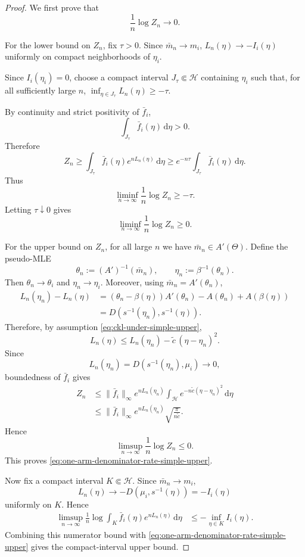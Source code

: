 \documentclass[10pt]{article}
\newcommand{\dd}{\mathrm{d}}
\theoremstyle{plain}
\begin{document}
\begin{proof}
We first prove that
\begin{equation}
\label{eq:one-arm-denominator-rate-simple-upper}
    \frac1n\log Z_n\to0.
\end{equation}

For the lower bound on \(Z_n\), fix \(\tau>0\).  Since $\bar m_n\to m_i$, $L_n(\eta)\to -I_i(\eta)$ uniformly on compact neighborhoods of \(\eta_i\).  

Since \(I_i(\eta_i)=0\), choose a compact interval \(J_\tau\Subset\mathcal H\) containing \(\eta_i\) such that, for
all sufficiently large \(n\), $\inf_{\eta\in J_\tau}L_n(\eta)\ge -\tau$.

By continuity and strict positivity of \(\bar f_i\),
\[
    \int_{J_\tau}\bar f_i(\eta)\,\dd\eta>0.
\]
Therefore
\[
    Z_n
    \ge
    \int_{J_\tau}\bar f_i(\eta)e^{nL_n(\eta)}\,\dd\eta
    \ge
    e^{-n\tau}\int_{J_\tau}\bar f_i(\eta)\,\dd\eta.
\]
Thus
\[
    \liminf_{n\to\infty}\frac1n\log Z_n\ge -\tau.
\]
Letting \(\tau\downarrow0\) gives
\[
    \liminf_{n\to\infty}\frac1n\log Z_n\ge0.
\]

For the upper bound on \(Z_n\), for all large \(n\) we have
\(\bar m_n\in A'(\Theta)\).  Define the pseudo-MLE
\[
    \theta_n:=(A')^{-1}(\bar m_n),
    \qquad
    \eta_n:=\beta^{-1}(\theta_n).
\]
Then $\theta_n\to\theta_i$ and $\eta_n\to \eta_i$.
Moreover, using \(\bar m_n=A'(\theta_n)\),
\[
\begin{aligned}
    L_n(\eta_n)-L_n(\eta)
    &=
    (\theta_n-\beta(\eta))A'(\theta_n)
    -
    A(\theta_n)
    +
    A(\beta(\eta))                                                \\
    &=
    D(s^{-1}(\eta_n),s^{-1}(\eta)).
\end{aligned}
\]
Therefore, by assumption \eqref{eq:ckl-under-simple-upper},
\[
    L_n(\eta)
    \le
    L_n(\eta_n)-\widetilde{c}\,(\eta-\eta_n)^2.
\]
Since
\[
    L_n(\eta_n)
    =
    D(s^{-1}(\eta_n),\mu_i)
    \to0,
\]
boundedness of \(\bar f_i\) gives
\[
\begin{aligned}
    Z_n
    &\le
    \|\bar f_i\|_\infty
    e^{nL_n(\eta_n)}
    \int_{\mathcal H}e^{-n\widetilde{c} (\eta-\eta_n)^2}\,\dd\eta        \\
    &\le
    \|\bar f_i\|_\infty
    e^{nL_n(\eta_n)}
    \sqrt{\frac{\pi}{n\widetilde{c}}}.
\end{aligned}
\]
Hence
\[
    \limsup_{n\to\infty}\frac1n\log Z_n\le0.
\]
This proves \eqref{eq:one-arm-denominator-rate-simple-upper}.

Now fix a compact interval \(K\Subset\mathcal H\).  Since \(\bar m_n\to m_i\),
\[
    L_n(\eta)\to -D(\mu_i,s^{-1}(\eta))=-I_i(\eta)
\]
uniformly on \(K\).  Hence
\[
\begin{aligned}
    \limsup_{n\to\infty}
    \frac1n\log
    \int_K \bar f_i(\eta)e^{nL_n(\eta)}\,\dd\eta
    &\le
    -\inf_{\eta\in K}I_i(\eta).
\end{aligned}
\]
Combining this numerator bound with
\eqref{eq:one-arm-denominator-rate-simple-upper} gives the compact-interval
upper bound.


\end{proof}
\end{document}
